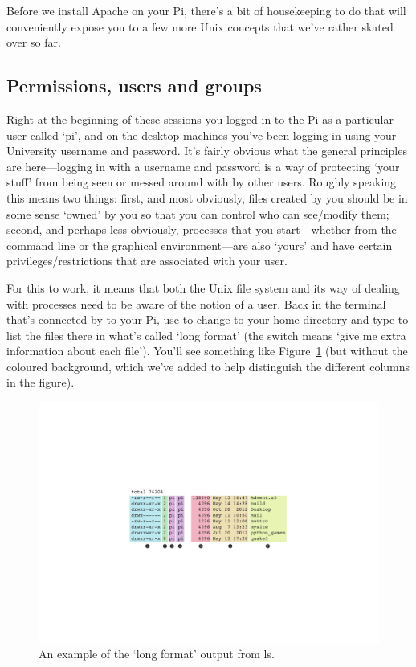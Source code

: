 Before we install Apache on your Pi, there's a bit of housekeeping to do that will conveniently expose you to a few more Unix concepts that we've rather skated over so far. 

\subsection{Permissions, users and groups}

Right at the beginning of these sessions you logged in to the Pi as a particular user called `pi', and on the desktop machines you've been logging in using your University username and password. It's fairly obvious what the general principles are here---logging in with a username and password is a way of protecting `your stuff' from being seen or messed around with by other users. Roughly speaking this means two things: first, and most obviously, files created by you should be in some sense `owned' by you so that you can control who can see/modify them; second, and perhaps less obviously, processes that you start---whether from the command line or the graphical environment---are also `yours' and have certain privileges/restrictions that are associated with your user. 

For this to work, it means that both the Unix file system and its way of dealing with processes need to be aware of the notion of a user. Back in the terminal that's connected by  to your Pi, use  to change to your home directory and type  to list the files there in what's called `long format' (the  switch means `give me extra information about each file'). You'll see something like Figure~\ref{figure:longformls} (but without the coloured background, which we've added to help distinguish the different columns in the figure).

\begin{figure}
\centerline{\includegraphics[width=14cm]{images/longformls}}
\caption{An example of the `long format' output from ls.}\label{figure:longformls}
\end{figure}

